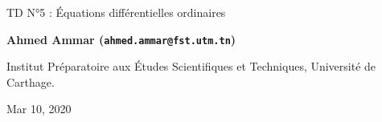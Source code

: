 \documentclass[%
oneside,                 %
final,                   %
10pt,french]{article}
\begin{document}

\newcommand{\exercisesection}[1]{\subsection*{#1}}






\thispagestyle{empty}

\begin{center}
{\LARGE\bf
\begin{spacing}{1.25}
TD N°5 : Équations différentielles ordinaires
\end{spacing}
}
\end{center}


\begin{center}
{\bf Ahmed Ammar (\texttt{ahmed.ammar@fst.utm.tn})}
\end{center}

    \begin{center}
\centerline{{\small Institut Préparatoire aux Études Scientifiques et Techniques, Université de Carthage.}}
\end{center}
    

\begin{center}
Mar 10, 2020
\end{center}

\vspace{1cm}


\tableofcontents


\vspace{1cm} %
\end{document}
